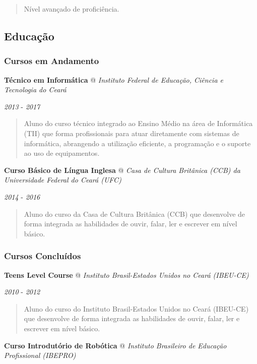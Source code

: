 \documentclass[]{article}
\begin{document}
\begin{quote}
Nível avançado de proficiência.
\end{quote}

\subsection{Educação}\label{educauxe7uxe3o}

\subsubsection{Cursos em Andamento}\label{cursos-em-andamento}

\textbf{Técnico em Informática} @ \emph{Instituto Federal de Educação,
Ciência e Tecnologia do Ceará}

\emph{2013} - \emph{2017}

\begin{quote}
Aluno do curso técnico integrado ao Ensino Médio na área de Informática
(TII) que forma profissionais para atuar diretamente com sistemas de
informática, abrangendo a utilização eficiente, a programação e o
suporte ao uso de equipamentos.
\end{quote}

\textbf{Curso Básico de Língua Inglesa} @ \emph{Casa de Cultura
Britânica (CCB) da Universidade Federal do Ceará (UFC)}

\emph{2014} - \emph{2016}

\begin{quote}
Aluno do curso da Casa de Cultura Britânica (CCB) que desenvolve de
forma integrada as habilidades de ouvir, falar, ler e escrever em nível
básico.
\end{quote}

\subsubsection{Cursos Concluídos}\label{cursos-concluuxeddos}

\textbf{Teens Level Course} @ \emph{Instituto Brasil-Estados Unidos no
Ceará (IBEU-CE)}

\emph{2010} - \emph{2012}

\begin{quote}
Aluno do curso do Instituto Brasil-Estados Unidos no Ceará (IBEU-CE) que
desenvolve de forma integrada as habilidades de ouvir, falar, ler e
escrever em nível básico.
\end{quote}

\textbf{Curso Introdutório de Robótica} @ \emph{Instituto Brasileiro de
Educação Profissional (IBEPRO)}
\end{document}
